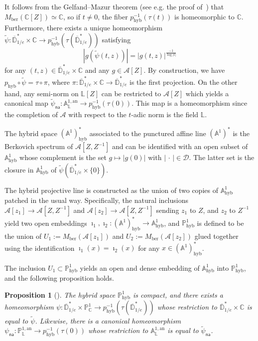 \documentclass[11pt]{article}
\newtheorem{prop}[theo]{Proposition}
\theoremstyle{definition}
\numberwithin{equation}{section}
\numberwithin{figure}{section}
\numberwithin{table}{section}
\DeclareMathOperator{\hyb}{hyb}
\newcommand{\cc}{\mathbb{C}}
\newcommand{\phyb}{{\mathbb{P}^1_{\mathrm{hyb}}}}
\newcommand{\cA}{\mathcal{A}}
\newcommand{\cD}{\mathcal{D}}
\newcommand{\A}{{\mathbb A}}
\newcommand{\D}{\mathbb{D}}
\newcommand{\an}{\mathrm{an}}
\newcommand{\PP}{\mathbb{P}}
\newcommand{\Laurent}{\mathbb{L}}
\newcommand{\lrpar}[1]{\left(#1\right)}
\newcommand{\na}{\mathsf{na}}
\newcommand{\inv}{^{-1}}
\begin{document}
It follows from the Gelfand--Mazur theorem (see e.g. the proof of~\cite[Prop.~1.1]{degeneration}) that $M_{\mathrm{ber}}(\cc[Z]) \simeq \cc$, so if $t\neq 0$, the fiber $p_{\hyb}\inv(\tau(t))$ is homeomorphic to $\cc$. Furthermore, there exists a unique homeomorphism $\widetilde \psi: \overline{\D}^*_{1/e} \times \cc \to p_{\hyb}^{-1}(\tau (\overline{\D}^*_{1/e})) $ satisfying
\begin{equation}\label{eq:identify}
|g(\widetilde\psi(t,z))| = |g(t,z)|^{\frac{-1}{\log \mathopen| t \mathclose|}}
\end{equation}
for any $(t,z) \in \overline{\D}^*_{1/e} \times \cc $ and any $g\in \cA[Z]$. By construction, we have $ p_{\hyb} \circ \widetilde\psi=\tau \circ \pi$, where $\pi: \overline{\D}^*_{1/e} \times \cc \to\overline{\D}^*_{1/e} $ is the first projection. On the other hand, any semi-norm on $\Laurent[Z]$ can be restricted to $\cA[Z]$ which yields a canonical map $\widetilde\psi_{\na}: \A^{1,\an}_{\Laurent} \to p_{\hyb}\inv(\tau(0))$. This map is a homeomorphism since the completion of $\cA$ with respect to the $t$-adic norm is the field $\Laurent$.


The hybrid space $(\A^1)^*_{\hyb}$ associated to the punctured affine line $(\A^1)^*$ is the Berkovich spectrum of $\cA[Z,Z^{-1}]$ and can be identified with an open subset of $\A^1_{\hyb}$ whose complement is the set $ g \mapsto |g(0)|$ with $|{\,\cdot\,}| \in \cD$. The latter set is the closure in $\A^1_{\hyb}$ of $\widetilde{\psi}\lrpar{\overline{\D}^*_{1/e} \times \{0\} }$.


The hybrid projective line is constructed as the union of two copies of $\A^1_{\hyb}$ patched in the usual way. Specifically, the natural inclusions $ \cA[z_1] \to \cA[Z,Z^{-1}]$ and $\cA[z_2] \to \cA[Z,Z^{-1}]$ sending $z_1$ to $Z$, and $z_2$ to $Z^{-1}$ yield two open embeddings $\imath_1, \imath_2\colon(\A^1)^*_{\hyb} \to \A^1_{\hyb}$, and $\phyb$ is defined to be the union of $U_1:=M_{\mathrm{ber}}(\cA[z_1])$ and $U_2 :=M_{\mathrm{ber}}(\cA[z_2])$ glued together using the identification $\imath_1(x) = \imath_2(x)$ for any $x\in (\A^1)^*_{\hyb}$.

The inclusion $U_1 \subset \PP^1_{\hyb}$ yields an open and dense embedding of $\A^1_{\hyb}$ into $\PP^1_{\hyb}$, and the following proposition holds.
\begin{prop}[\cite{degeneration}]
The hybrid space $\PP^1_{\hyb}$ is compact, and there exists a homeomorphism $\psi: \overline{\D}^*_{1/e} \times \PP^1_\cc \to p_{\hyb}^{-1}(\tau (\overline{\D}^*_{1/e})) $ whose restriction to $\overline{\D}^*_{1/e} \times \cc $ is equal to $\widetilde \psi $. Likewise, there is a \emph{canonical} homeomorphism $\psi_\na: \PP^{1,\an}_{\Laurent} \to p_{\hyb}\inv(\tau(0))$ whose restriction to $\A^{1,\an}_{\Laurent}$ is equal to $\widetilde \psi_{\na}$.
\end{prop}
\end{document}

